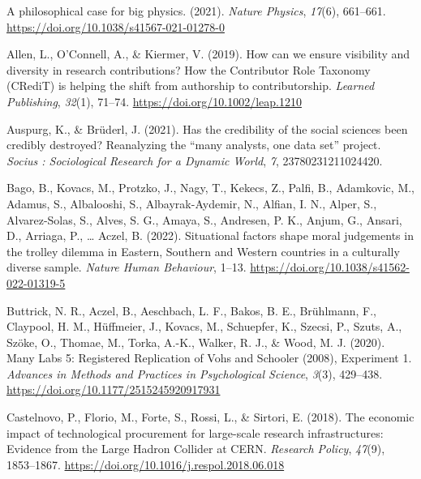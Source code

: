 \documentclass[
  man]{apa7}
\newlength{\cslhangindent}
\newlength{\cslentryspacingunit} %
\newenvironment{CSLReferences}[2] %
 {%
  \setlength{\parindent}{0pt}
  \ifodd #1
  \let\oldpar\par
  \def\par{\hangindent=\cslhangindent\oldpar}
  \fi
  \setlength{\parskip}{#2\cslentryspacingunit}
 }%
 {}
\begin{document}
\begingroup
\setlength{\parindent}{-0.5in}
\setlength{\leftskip}{0.5in}

\hypertarget{refs}{}
\begin{CSLReferences}{1}{0}
\leavevmode{}%
A philosophical case for big physics. (2021). \emph{Nature Physics}, \emph{17}(6), 661--661. \url{https://doi.org/10.1038/s41567-021-01278-0}

\leavevmode{}%
Allen, L., O'Connell, A., \& Kiermer, V. (2019). How can we ensure visibility and diversity in research contributions? How the Contributor Role Taxonomy (CRediT) is helping the shift from authorship to contributorship. \emph{Learned Publishing}, \emph{32}(1), 71--74. \url{https://doi.org/10.1002/leap.1210}

\leavevmode{}%
Auspurg, K., \& Brüderl, J. (2021). Has the credibility of the social sciences been credibly destroyed? Reanalyzing the {``}many analysts, one data set{''} project. \emph{Socius : Sociological Research for a Dynamic World}, \emph{7}, 23780231211024420.

\leavevmode{}%
Bago, B., Kovacs, M., Protzko, J., Nagy, T., Kekecs, Z., Palfi, B., Adamkovic, M., Adamus, S., Albalooshi, S., Albayrak-Aydemir, N., Alfian, I. N., Alper, S., Alvarez-Solas, S., Alves, S. G., Amaya, S., Andresen, P. K., Anjum, G., Ansari, D., Arriaga, P., \ldots{} Aczel, B. (2022). Situational factors shape moral judgements in the trolley dilemma in Eastern, Southern and Western countries in a culturally diverse sample. \emph{Nature Human Behaviour}, 1--13. \url{https://doi.org/10.1038/s41562-022-01319-5}

\leavevmode{}%
Buttrick, N. R., Aczel, B., Aeschbach, L. F., Bakos, B. E., Brühlmann, F., Claypool, H. M., Hüffmeier, J., Kovacs, M., Schuepfer, K., Szecsi, P., Szuts, A., Szöke, O., Thomae, M., Torka, A.-K., Walker, R. J., \& Wood, M. J. (2020). Many Labs 5: Registered Replication of Vohs and Schooler (2008), Experiment 1. \emph{Advances in Methods and Practices in Psychological Science}, \emph{3}(3), 429--438. \url{https://doi.org/10.1177/2515245920917931}

\leavevmode{}%
Castelnovo, P., Florio, M., Forte, S., Rossi, L., \& Sirtori, E. (2018). The economic impact of technological procurement for large-scale research infrastructures: Evidence from the Large Hadron Collider at CERN. \emph{Research Policy}, \emph{47}(9), 1853--1867. \url{https://doi.org/10.1016/j.respol.2018.06.018}


\end{CSLReferences}
\end{document}
